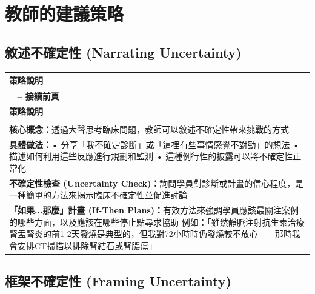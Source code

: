 \documentclass[12pt,a4paper]{article}
\begin{document}
\section{教師的建議策略}

\subsection{敘述不確定性 (Narrating Uncertainty)}

\begin{longtable}{>{\raggedright\arraybackslash}p{15cm}}
\toprule
\textbf{\textcolor{emergency_red}{策略說明}} \\
\midrule
\endfirsthead

\multicolumn{1}{c}%
{{\bfseries \tablename\ \thetable{} -- 接續前頁}} \\
\toprule
\textbf{\textcolor{emergency_red}{策略說明}} \\
\midrule
\endhead

\midrule \multicolumn{1}{r}{{接續下頁}} \\ \midrule
\endfoot

\bottomrule
\endlastfoot

\textbf{核心概念：}透過大聲思考臨床問題，教師可以敘述不確定性帶來挑戰的方式 \\

\textbf{具體做法：}\newline • 分享「我不確定診斷」或「這裡有些事情感覺不對勁」的想法 \newline • 描述如何利用這些反應進行規劃和監測 \newline • 這種例行性的披露可以將不確定性正常化 \\

\textbf{不確定性檢查 (Uncertainty Check)：}\newline 詢問學員對診斷或計畫的信心程度，是一種簡單的方法來揭示臨床不確定性並促進討論 \\

\textbf{「如果...那麼」計畫 (If-Then Plans)：}\newline 有效方法來強調學員應該最關注案例的哪些方面，以及應該在哪些停止點尋求協助 \newline 例如：「雖然靜脈注射抗生素治療腎盂腎炎的前1-2天發燒是典型的，但我對72小時時仍發燒較不放心——那時我會安排CT掃描以排除腎結石或腎膿瘍」 \\
\end{longtable}

\subsection{框架不確定性 (Framing Uncertainty)}
\end{document}
